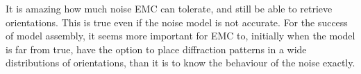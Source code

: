 It is amazing how much noise EMC can tolerate, and still be able to retrieve orientations. This is true even if the noise model is not accurate. For the success of model assembly, it seems more important for EMC to, initially when the model is far from true, have the option to place diffraction patterns in a wide distributions of orientations, than it is to know the behaviour of the noise exactly.


